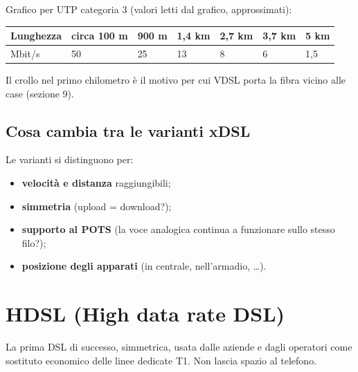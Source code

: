 Grafico per UTP categoria 3 (valori letti dal grafico, approssimati):

\begin{longtable}[]{@{}lllllll@{}}
\toprule\noalign{}
Lunghezza & circa 100 m & 900 m & 1,4 km & 2,7 km & 3,7 km & 5 km \\
\midrule\noalign{}
\endhead
\bottomrule\noalign{}
\endlastfoot
Mbit/s & 50 & 25 & 13 & 8 & 6 & 1,5 \\
\end{longtable}

Il crollo nel primo chilometro è il motivo per cui VDSL porta la fibra vicino alle case (sezione 9).

\subsection{Cosa cambia tra le varianti xDSL}

Le varianti si distinguono per:

\begin{itemize}
\tightlist
\item
  \textbf{velocità e distanza} raggiungibili;
\item
  \textbf{simmetria} (upload = download?);
\item
  \textbf{supporto al POTS} (la voce analogica continua a funzionare sullo stesso filo?);
\item
  \textbf{posizione degli apparati} (in centrale, nell'armadio, \ldots).
\end{itemize}

\section{HDSL (High data rate DSL)}

\begin{inbreve}

La prima DSL di successo, simmetrica, usata dalle aziende e dagli operatori come sostituto economico delle linee dedicate T1. Non lascia spazio al telefono.

\end{inbreve}

